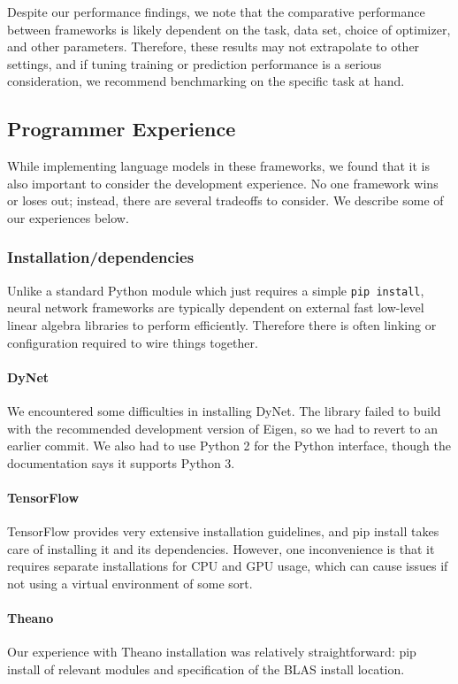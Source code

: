 \documentclass{article}
\begin{document}
Despite our performance findings, we note that the comparative performance between frameworks is likely dependent on the task, data set, choice of optimizer, and other parameters. Therefore, these results may not extrapolate to other settings, and if tuning training or prediction performance is a serious consideration, we recommend benchmarking on the specific task at hand.

\subsection{Programmer Experience}

While implementing language models in these frameworks, we found that it is also important to consider the development experience. No one framework wins or loses out; instead, there are several tradeoffs to consider. We describe some of our experiences below.

\subsubsection{Installation/dependencies}

Unlike a standard Python module which just requires a simple \texttt{pip install}, neural network frameworks are typically dependent on external fast low-level linear algebra libraries to perform efficiently. Therefore there is often linking or configuration required to wire things together.

\paragraph{DyNet} We encountered some difficulties in installing DyNet. The library failed to build with the recommended development version of Eigen, so we had to revert to an earlier commit. We also had to use Python 2 for the Python interface, though the documentation says it supports Python 3.

\paragraph{TensorFlow}
TensorFlow provides very extensive installation guidelines, and pip install takes care of installing it and its dependencies. However, one inconvenience is that it requires separate installations for CPU and GPU usage, which can cause issues if not using a virtual environment of some sort.

\paragraph{Theano} Our experience with Theano installation was relatively straightforward: pip install of relevant modules and specification of the BLAS install location.
\end{document}
